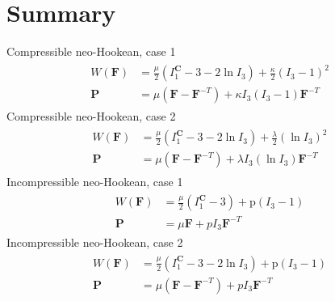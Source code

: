 \documentclass[12pt,3p]{article}
\numberwithin{equation}{section}
\begin{document}
\section{Summary}
Compressible neo-Hookean, case 1
\begin{align}
\begin{split}
W(\mathbf{F}) &= \frac{\mu}{2} (I_1^{\mathbf{C}} - 3 - 2 \ln I_3) + \frac{\kappa}{2} (I_3 - 1)^2 \\
\mathbf{P} &= \mu ( \mathbf{F} - \mathbf{F}^{-T}) + \kappa I_3 (I_3 - 1) \mathbf{F}^{-T} 
\end{split}
\end{align}
Compressible neo-Hookean, case 2
\begin{align}
\begin{split}
W(\mathbf{F}) &= \frac{\mu}{2} (I_1^{\mathbf{C}} - 3 - 2 \ln I_3) + \frac{\lambda}{2} (\ln I_3)^2 \\
\mathbf{P} &= \mu ( \mathbf{F} - \mathbf{F}^{-T}) + \lambda I_3 (\ln I_3) \mathbf{F}^{-T} 
\end{split}
\end{align}
Incompressible neo-Hookean, case 1
\begin{align}
\begin{split}
W(\mathbf{F}) &= \frac{\mu}{2} (I_1^{\mathbf{C}}  - 3)  + \text{p} (I_3-1) \\
\mathbf{P} &= \mu \mathbf{F} + p I_3 \mathbf{F}^{-T} 
\end{split}
\end{align}
Incompressible neo-Hookean, case 2 
\begin{align}
\begin{split}
W(\mathbf{F}) &= \frac{\mu}{2} (I_1^{\mathbf{C}}  - 3 - 2 \ln I_3 )  + \text{p} (I_3-1) \\
\mathbf{P} &= \mu ( \mathbf{F} - \mathbf{F}^{-T}) + p I_3 \mathbf{F}^{-T} 
\end{split}
\end{align}
\end{document}
